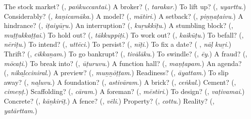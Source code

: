 \begin{tcolorbox}[breakable,colback=teal!4,colframe=teal!35!black,title={Before you move on}]
The stock market? (\textbf{}, \emph{paṅkuccantai}.) A broker? (\textbf{}, \emph{tarakar}.) To lift up? (\textbf{}, \emph{uyarttu}.) Considerably? (\textbf{}, \emph{kaṇicamāka}.) A model? (\textbf{}, \emph{mātiri}.) A setback? (\textbf{}, \emph{piṉṉaṭaivu}.) A hindrance? (\textbf{}, \emph{iṭaiyūṟu}.) An interruption? (\textbf{}, \emph{kuṟukkīṭu}.) A stumbling block? (\textbf{}, \emph{muṭṭukkaṭṭai}.) To hold out? (\textbf{}, \emph{tākkuppiṭi}.) To work out? (\textbf{}, \emph{kaikūṭu}.) To befall? (\textbf{}, \emph{nēriṭu}.) To intend? (\textbf{}, \emph{uttēci}.) To persist? (\textbf{}, \emph{nīṭi}.) To fix a date? (\textbf{ }, \emph{nāḷ kuṟi}.) Thrift? (\textbf{}, \emph{cikkaṉam}.) To go bankrupt? (\textbf{}, \emph{tivālāku}.) To swindle? (\textbf{}, \emph{ēy}.) A fraud? (\textbf{}, \emph{mōcaṭi}.) To break into? (\textbf{}, \emph{ūṭuruvu}.) A function hall? (\textbf{}, \emph{maṇṭapam}.) An agenda? (\textbf{}, \emph{nikaḻcciniral}.) A preview? (\textbf{}, \emph{muṉṉōṭṭam}.) Readiness? (\textbf{}, \emph{āyattam}.) To slip away? (\textbf{}, \emph{naḻuvu}.) A foundation? (\textbf{}, \emph{astivāram}.) A brick? (\textbf{}, \emph{ceṅkal}.) Cement? (\textbf{}, \emph{cimeṇṭ}.) Scaffolding? (\textbf{}, \emph{cāram}.) A foreman? (\textbf{}, \emph{mēstiri}.) To design? (\textbf{}, \emph{vaṭivamai}.) Concrete? (\textbf{}, \emph{kāṉkirīṭ}.) A fence? (\textbf{}, \emph{vēli}.) Property? (\textbf{}, \emph{cottu}.) Reality? (\textbf{}, \emph{yatārttam}.)
\end{tcolorbox}
